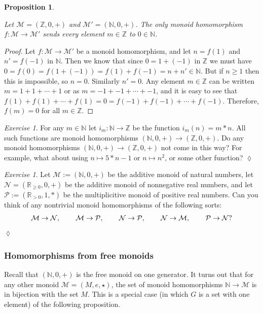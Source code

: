 \documentclass{book}
\def\mc{\mathcal}
\def\ZZ{{\mathbb Z}}
\def\RR{{\mathbb R}}
\def\NN{{\mathbb N}}
\def\hsp{\hspace{.3in}}
\def\to{\rightarrow}
\def\taking{\colon}
\def\mcM{\mc{M}}
\def\mcN{\mc{N}}
\def\mcP{\mc{P}}
\newtheorem{proposition}[subsubsection]{Proposition}
\theoremstyle{remark}
\newtheorem{exc}[subsubsection]{Exercise}
\newenvironment{exercise}{\begin{exc}}{\hspace*{\fill}$\lozenge$\end{exc}}
\theoremstyle{definition}
\begin{document}
\begin{proposition}\label{prop:int to nat trivial}

Let $\mcM=(\ZZ,0,+)$ and $\mcM'=(\NN,0,+)$. The only monoid homomorphism $f\taking\mcM\to\mcM'$ sends every element $m\in\ZZ$ to $0\in\NN$.

\end{proposition}

\begin{proof}

Let $f\taking\mcM\to\mcM'$ be a monoid homomorphism, and let $n=f(1)$ and $n'=f(-1)$ in $\NN$. Then we know that since $0=1+(-1)$ in $\ZZ$ we must have $0=f(0)=f(1+(-1))=f(1)+f(-1)=n+n'\in\NN$. But if $n\geq 1$ then this is impossible, so $n=0$. Similarly $n'=0$. Any element $m\in\ZZ$ can be written $m=1+1+\cdots+1$ or as $m=-1+-1+\cdots+-1$, and it is easy to see that $f(1)+f(1)+\cdots+f(1)=0=f(-1)+f(-1)+\cdots+f(-1)$. Therefore, $f(m)=0$ for all $m\in\ZZ$. 

\end{proof}

\begin{exercise}
For any $m\in\NN$ let $i_m\taking\NN\to\ZZ$ be the function $i_m(n)=m*n$. All such functions are monoid homomorphisms $(\NN,0,+)\to(\ZZ,0,+)$. Do any monoid homomorphisms $(\NN,0,+)\to(\ZZ,0,+)$ not come in this way? For example, what about using $n\mapsto 5*n-1$ or $n\mapsto n^2$, or some other function? 
\end{exercise}

\begin{exercise}
Let $\mcM:=(\NN,0,+)$ be the additive monoid of natural numbers, let $\mcN=(\RR_{\geq0},0,+)$ be the additive monoid of nonnegative real numbers, and let $\mcP:=(\RR_{>0},1,*)$ be the multiplicitive monoid of positive real numbers. Can you think of any nontrivial monoid homomorphisms of the following sorts: $$\mcM\to\mcN,\hsp\mcM\to\mcP,\hsp\mcN\to\mcP,\hsp \mcN\to\mcM,\hsp\mcP\to\mcN?$$
\end{exercise}



\subsubsection{Homomorphisms from free monoids}

Recall that $(\NN,0,+)$ is the free monoid on one generator. It turns out that for any other monoid $\mcM=(M,e,\star)$, the set of monoid homomorphisms $\NN\to\mcM$ is in bijection with the set $M$. This is a special case (in which $G$ is a set with one element) of the following proposition.
\end{document}
